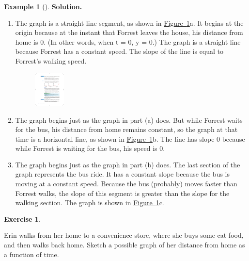 \documentclass[10pt,]{book}
\theoremstyle{plain}
\theoremstyle{definition}
\theoremstyle{definition}
\theoremstyle{definition}
\newtheorem{example}[theorem]{Example}
\theoremstyle{definition}
\theoremstyle{definition}
\newtheorem{exercise}[theorem]{Exercise}
\numberwithin{equation}{section}
\begin{document}
\begin{example}[]
\par\medskip\noindent%
\textbf{Solution.}\quad \leavevmode%
\begin{enumerate}[label=*\alph**]
\item\hypertarget{li-320}{}The graph is a straight-line segment, as shown in \hyperref[fig-home-to-school]{Figure~\ref{fig-home-to-school}}a. It begins at the origin because at the instant that Forrest leaves the house, his distance from home is 0. (In other words, when t = 0, y = 0.) The graph is a straight line because Forrest has a constant speed. The slope of the line is equal to Forrest’s walking speed.
            \leavevmode%
\begin{figure}
\centering
\includegraphics[width=0.150\textwidth,]{images/fig-home-to-school.pdf}\caption{\label{fig-home-to-school}}
\end{figure}
\item\hypertarget{li-321}{}The graph begins just as the graph in part (a) does. But while Forrest waits for the bus, his distance from home remains constant, so the graph at that time is a horizontal line, as shown in \hyperref[fig-home-to-school]{Figure~\ref{fig-home-to-school}}b. The line has slope \(0\) because while Forrest is waiting for the bus, his speed is \(0\).
            \item\hypertarget{li-322}{}
                The graph begins just as the graph in part (b) does. The last section of the graph represents the bus ride. It has a constant slope because the bus is moving at a constant speed. Because the bus (probably) moves faster than Forrest walks, the slope of this segment is greater than the slope for the walking section. The graph is shown in \hyperref[fig-home-to-school]{Figure~\ref{fig-home-to-school}}c.
            \end{enumerate}
\end{example}
\begin{exercise}\label{exercise-walk-to-store}

    Erin walks from her home to a convenience store, where she buys some cat food, and then walks back home. Sketch a possible graph of her distance from home as a function of time.
\end{exercise}
\par
\end{document}
